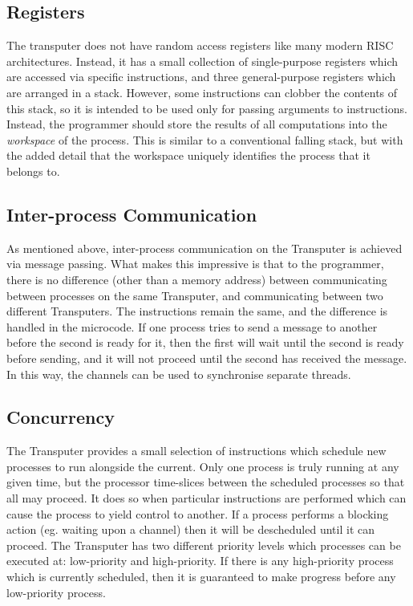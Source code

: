 \subsection{Registers}

The transputer does not have random access registers like many modern RISC
architectures. Instead, it has a small collection of single-purpose registers
which are accessed via specific instructions, and three general-purpose
registers which are arranged in a stack. However, some instructions can clobber
the contents of this stack, so it is intended to be used only for passing
arguments to instructions. Instead, the programmer should store the results of
all computations into the \textit{\gls{workspace}} of the process. This is
similar to a conventional falling stack, but with the added detail that the
workspace uniquely identifies the process that it belongs to.

\subsection{Inter-process Communication}

As mentioned above, inter-process communication on the Transputer is achieved
via message passing. What makes this impressive is that to the programmer, there
is no difference (other than a memory address) between communicating between
processes on the same Transputer, and communicating between two different
Transputers. The instructions remain the same, and the difference is handled in
the microcode. If one process tries to send a message to another before the
second is ready for it, then the first will wait until the second is ready
before sending, and it will not proceed until the second has received the
message. In this way, the channels can be used to synchronise separate threads.

\subsection{Concurrency}

The Transputer provides a small selection of instructions which schedule new
processes to run alongside the current. Only one process is truly running at any
given time, but the processor time-slices between the scheduled processes so
that all may proceed. It does so when particular instructions are performed
which can cause the process to yield control to another. If a process performs a
blocking action (eg. waiting upon a channel) then it will be descheduled until
it can proceed. The Transputer has two different priority levels which processes
can be executed at: low-priority and high-priority. If there is any
high-priority process which is currently scheduled, then it is guaranteed to
make progress before any low-priority process.

